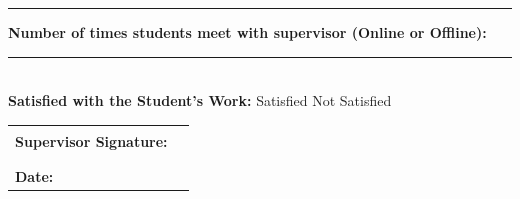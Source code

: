 \documentclass[12pt,a4paper]{article}
\begin{document}
\vspace{1cm}
\noindent\rule{\textwidth}{0.4pt}

\vspace{0.5cm}

\noindent\textbf{Number of times students meet with supervisor (Online or Offline):} \rule{1cm}{0.4pt} \\

\noindent\textbf{Satisfied with the Student's Work:} 
\hspace{0.5cm} Satisfied 
\hspace{1cm} Not Satisfied

\vspace{0.5cm}

\vspace{1.5cm}

\noindent\begin{tabular}{p{7cm} p{6cm}}
\textbf{Supervisor Signature:} & \rule{5cm}{0.4pt} \\
\\
\textbf{Date:} 
\end{tabular}

\vspace{0.8cm}
\end{document}
